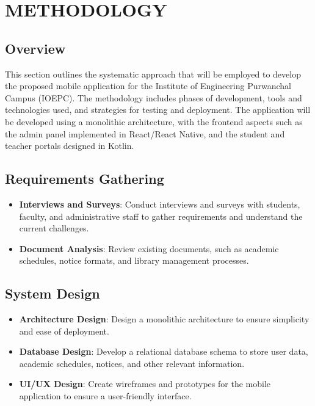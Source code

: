 \chapter{METHODOLOGY}

\section{Overview}
This section outlines the systematic approach that will be employed to develop the proposed mobile application for the Institute of Engineering Purwanchal Campus (IOEPC). The methodology includes phases of development, tools and technologies used, and strategies for testing and deployment. The application will be developed using a monolithic architecture, with the frontend aspects such as the admin panel implemented in React/React Native, and the student and teacher portals designed in Kotlin.

\section{Requirements Gathering}
\begin{itemize}
    \item \textbf{Interviews and Surveys}: Conduct interviews and surveys with students, faculty, and administrative staff to gather requirements and understand the current challenges.
    \item \textbf{Document Analysis}: Review existing documents, such as academic schedules, notice formats, and library management processes.
\end{itemize}

\section{System Design}
\begin{itemize}
    \item \textbf{Architecture Design}: Design a monolithic architecture to ensure simplicity and ease of deployment.
    \item \textbf{Database Design}: Develop a relational database schema to store user data, academic schedules, notices, and other relevant information.
    \item \textbf{UI/UX Design}: Create wireframes and prototypes for the mobile application to ensure a user-friendly interface.
\end{itemize}

